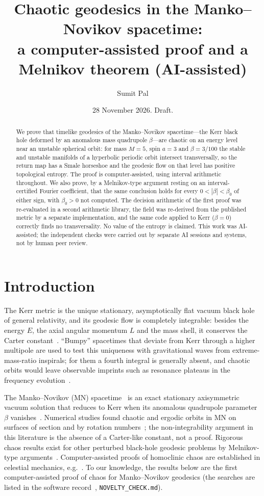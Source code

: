 \documentclass[11pt]{amsart}
\title[Chaotic geodesics in the Manko--Novikov spacetime]{Chaotic geodesics in the Manko--Novikov spacetime:\\ a computer-assisted proof and a Melnikov theorem (AI-assisted)}
\author{Sumit Pal}
\date{28 November 2026. Draft.}
\theoremstyle{remark}\newtheorem*{remark}{Remark}
\begin{document}
\begin{abstract}
We prove that timelike geodesics of the Manko--Novikov spacetime---the Kerr black hole deformed by an anomalous mass
quadrupole $\beta$---are chaotic on an energy level near an unstable spherical orbit: for mass $M=5$, spin $a=3$ and
$\beta=3/100$ the stable and unstable manifolds of a hyperbolic periodic orbit intersect transversally, so the return
map has a Smale horseshoe and the geodesic flow on that level has positive topological entropy. The proof is
computer-assisted, using interval arithmetic throughout. We also prove, by a Melnikov-type argument resting on an
interval-certified Fourier coefficient, that the same conclusion holds for every $0<|\beta|<\beta_0$ of either sign,
with $\beta_0>0$ not computed. The decision arithmetic of the first proof was re-evaluated in a second arithmetic
library, the field was re-derived from the published metric by a separate implementation, and the same code applied
to Kerr ($\beta=0$) correctly finds no transversality. No value of the entropy is claimed. This work was AI-assisted;
the independent checks were carried out by separate AI sessions and systems, not by human peer review.
\end{abstract}

\maketitle

\section{Introduction}
The Kerr metric is the unique stationary, asymptotically flat vacuum black hole of general relativity, and its
geodesic flow is completely integrable: besides the energy $E$, the axial angular momentum $L$ and the mass shell, it
conserves the Carter constant~\cite{Carter}. ``Bumpy'' spacetimes that deviate from Kerr through a higher multipole
are used to test this uniqueness with gravitational waves from extreme-mass-ratio inspirals; for them a fourth
integral is generally absent, and chaotic orbits would leave observable imprints such as resonance plateaus in the
frequency evolution~\cite{GLM,ALC}.

The Manko--Novikov (MN) spacetime~\cite{MN} is an exact stationary axisymmetric vacuum solution that reduces to Kerr
when its anomalous quadrupole parameter $\beta$ vanishes~\cite{GLM}. Numerical studies found chaotic and ergodic
orbits in MN on surfaces of section and by rotation numbers~\cite{GLM,ALC,CLA}; the non-integrability argument in
this literature is the absence of a Carter-like constant, not a proof. Rigorous chaos results exist for other
perturbed black-hole geodesic problems by Melnikov-type arguments~\cite{Moeckel,BC,LV,PS}. Computer-assisted proofs of
homoclinic chaos are established in celestial mechanics, e.g.~\cite{CKMJ}. To our knowledge, the results below are the
first computer-assisted proof of chaos for Manko--Novikov geodesics (the searches are listed in the software
record~\cite{Software}, \texttt{NOVELTY\_CHECK.md}).
\end{document}
